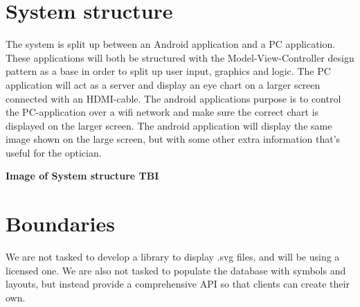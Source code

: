 \documentclass[12pt,a4paper,notitlepage]{report}
\begin{document}
\section{System structure} %
The system is split up between an Android application and a PC application. These applications will both be structured with the Model-View-Controller design pattern as a base in order to split up user input, graphics and logic. The PC application will act as a server and display an eye chart on a larger screen connected with an HDMI-cable. The android applications purpose is to control the PC-application over a wifi network and make sure the correct chart is displayed on the larger screen. The android application will display the same image shown on the large screen, but with some other extra information that's useful for the optician.

\textbf{Image of System structure TBI}



\section{Boundaries}
We are not tasked to develop a library to display .svg files, and will be using a licensed one. We are also not tasked to populate the database with symbols and layouts, but instead provide a comprehensive API so that clients can create their own.

\end{document}
